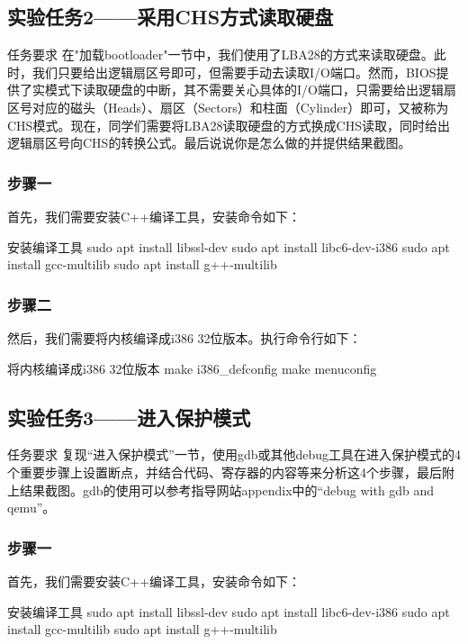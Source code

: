 \documentclass{sysucseexp}
\begin{document}
\subsection{实验任务2——采用CHS方式读取硬盘}
\begin{titledBox}{任务要求}
  在"加载bootloader"一节中，我们使用了LBA28的方式来读取硬盘。此时，我们只要给出逻辑扇区号即可，但需要手动去读取I/O端口。然而，BIOS提供了实模式下读取硬盘的中断，其不需要关心具体的I/O端口，只需要给出逻辑扇区号对应的磁头（Heads）、扇区（Sectors）和柱面（Cylinder）即可，又被称为CHS模式。现在，同学们需要将LBA28读取硬盘的方式换成CHS读取，同时给出逻辑扇区号向CHS的转换公式。最后说说你是怎么做的并提供结果截图。
\end{titledBox}
\subsubsection{步骤一}
首先，我们需要安装C++编译工具，安装命令如下：
\begin{ubtdark}{安装编译工具}
  sudo apt install libssl-dev
  sudo apt install libc6-dev-i386
  sudo apt install gcc-multilib 
  sudo apt install g++-multilib
\end{ubtdark}
\subsubsection{步骤二}
然后，我们需要将内核编译成i386 32位版本。执行命令行如下：
\begin{ubtdark}{将内核编译成i386 32位版本}
  make i386_defconfig
  make menuconfig
\end{ubtdark}

\subsection{实验任务3——进入保护模式}
\begin{titledBox}{任务要求}
  复现“进入保护模式”一节，使用gdb或其他debug工具在进入保护模式的4个重要步骤上设置断点，并结合代码、寄存器的内容等来分析这4个步骤，最后附上结果截图。gdb的使用可以参考指导网站appendix中的“debug with gdb and qemu”。
\end{titledBox}

\subsubsection{步骤一}
首先，我们需要安装C++编译工具，安装命令如下：
\begin{ubtdark}{安装编译工具}
  sudo apt install libssl-dev
  sudo apt install libc6-dev-i386
  sudo apt install gcc-multilib 
  sudo apt install g++-multilib
\end{ubtdark}
\end{document}
